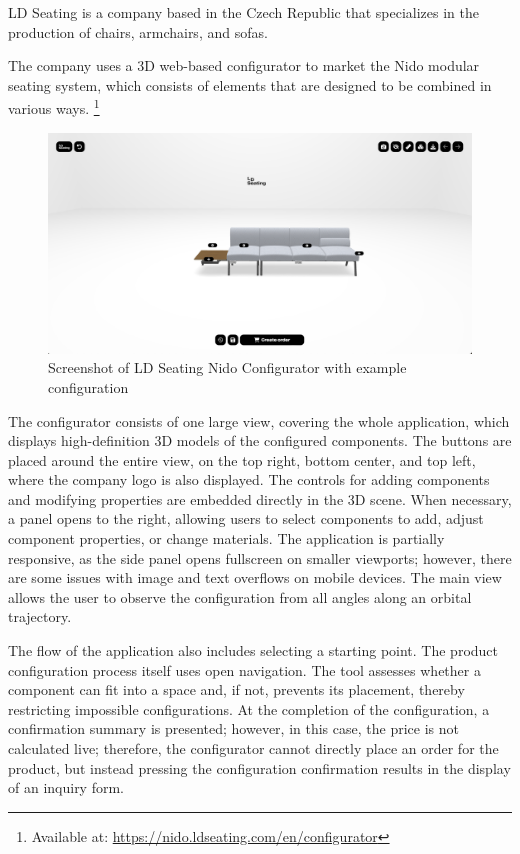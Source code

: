 LD Seating is a company based in the Czech Republic that specializes in the production of chairs, armchairs, and sofas. \cite{LDSeating}

The company uses a 3D web-based configurator to market the Nido modular seating system, which consists of elements that are designed to be combined in various ways. \footnote{Available at: \url{https://nido.ldseating.com/en/configurator}}

\begin{figure}[ht]
\centering
\includegraphics[width=\textwidth]{images/analysis_nido-configurator.png}
\caption{Screenshot of LD Seating Nido Configurator with example configuration}
\end{figure}

The configurator consists of one large view, covering the whole application, which displays high-definition 3D models of the configured components. The buttons are placed around the entire view, on the top right, bottom center, and top left, where the company logo is also displayed.  The controls for adding components and modifying properties are embedded directly in the 3D scene. When necessary, a panel opens to the right, allowing users to select components to add, adjust component properties, or change materials. The application is partially responsive, as the side panel opens fullscreen on smaller viewports; however, there are some issues with image and text overflows on mobile devices. The main view allows the user to observe the configuration from all angles along an orbital trajectory.

The flow of the application also includes selecting a starting point. The product configuration process itself uses open navigation. The tool assesses whether a component can fit into a space and, if not, prevents its placement, thereby restricting impossible configurations. At the completion of the configuration, a confirmation summary is presented; however, in this case, the price is not calculated live; therefore, the configurator cannot directly place an order for the product, but instead pressing the configuration confirmation results in the display of an inquiry form.

